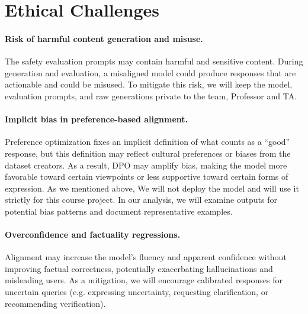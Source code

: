 \documentclass[11pt]{article}
\begin{document}
\section{Ethical Challenges}
\paragraph{Risk of harmful content generation and misuse.}
The safety evaluation prompts may contain harmful and sensitive content. During generation and evaluation, a misaligned model could produce responses that are actionable and could be misused. To mitigate this risk, we will keep the model, evaluation prompts, and raw generations private to the team, Professor and TA. 

\paragraph{Implicit bias in preference-based alignment.}
Preference optimization fixes an implicit definition of what counts as a ``good'' response, but this definition may reflect cultural preferences or biases from the dataset creators. As a result, DPO may amplify bias, making the model more favorable toward certain viewpoints or less supportive toward certain forms of expression. As we mentioned above, We will not deploy the model and will use it strictly for this course project. In our analysis, we will examine outputs for potential bias patterns and document representative examples.

\paragraph{Overconfidence and factuality regressions.}
Alignment may increase the model's fluency and apparent confidence without improving factual correctness, potentially exacerbating hallucinations and misleading users. As a mitigation, we will encourage calibrated responses for uncertain queries (e.g. expressing uncertainty, requesting clarification, or recommending verification).
\end{document}
